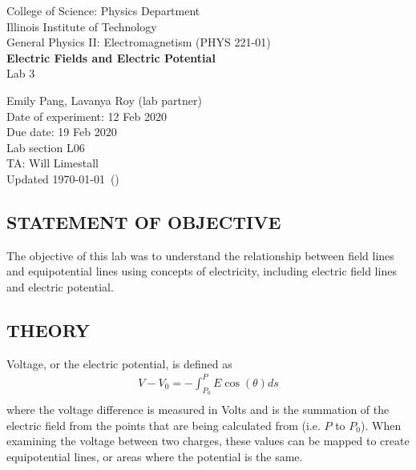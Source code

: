 \documentclass [12pt, letterpaper, twoside] {article}
\begin{document}
\begin {titlepage}
\begin {center}
College of Science: Physics Department \\
\vspace {0.1cm}
Illinois Institute of Technology\\
\vspace {0.1cm}
General Physics II: Electromagnetism (PHYS 221-01)\\
\vspace* {\fill}
\begingroup
\Large
\textbf {Electric Fields and Electric Potential} \\
\vspace {0.35cm}
\normalsize
Lab 3
\vspace {1.5cm}
\endgroup
\vspace* {\fill}
\end {center}

\vspace*{\fill}
\begin {flushright}
\footnotesize
Emily Pang, Lavanya Roy (lab partner) \\
Date of experiment: 12 Feb 2020 \\
Due date: 19 Feb 2020 \\
Lab section L06 \\
TA: Will Limestall \\
Updated \usdate\today~(\currenttime)
\end {flushright}
\end {titlepage}
\subsection* {STATEMENT OF OBJECTIVE}
The objective of this lab was to understand the relationship between field lines and equipotential lines using concepts of electricity, including electric field lines and electric potential.

\subsection* {THEORY}
Voltage, or the electric potential, is defined as
\begin{equation}
  \begin{split}
    V - V_{0} = -\int_{P_{0}}^{P}E\cos(\theta)ds \\
  \end{split}
\end{equation}
where the voltage difference is measured in Volts and is the summation of the electric field from the points that are being calculated from (i.e. \(P\) to \(P_{0}\)). \cite{labManual} When examining the voltage between two charges, these values can be mapped to create equipotential lines, or areas where the potential is the same. 
\end{document}
